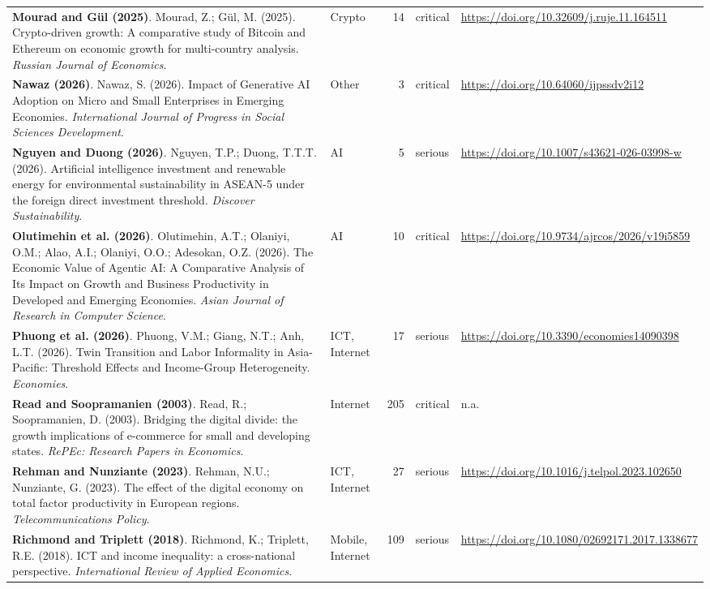 {\begin{longtable}{@{}p{7.4cm} p{1.3cm} r l p{3.4cm}@{}}
\textbf{Mourad and Gül (2025)}. Mourad, Z.; Gül, M. (2025). Crypto-driven growth: A comparative study of Bitcoin and Ethereum on economic growth for multi-country analysis. \emph{Russian Journal of Economics}. & Crypto & 14 & critical & \url{https://doi.org/10.32609/j.ruje.11.164511} \\
\textbf{Nawaz (2026)}. Nawaz, S. (2026). Impact of Generative AI Adoption on Micro and Small Enterprises in Emerging Economies. \emph{International Journal of Progress in Social Sciences Development}. & Other & 3 & critical & \url{https://doi.org/10.64060/ijpssdv2i12} \\
\textbf{Nguyen and Duong (2026)}. Nguyen, T.P.; Duong, T.T.T. (2026). Artificial intelligence investment and renewable energy for environmental sustainability in ASEAN-5 under the foreign direct investment threshold. \emph{Discover Sustainability}. & AI & 5 & serious & \url{https://doi.org/10.1007/s43621-026-03998-w} \\
\textbf{Olutimehin et al. (2026)}. Olutimehin, A.T.; Olaniyi, O.M.; Alao, A.I.; Olaniyi, O.O.; Adesokan, O.Z. (2026). The Economic Value of Agentic AI: A Comparative Analysis of Its Impact on Growth and Business Productivity in Developed and Emerging Economies. \emph{Asian Journal of Research in Computer Science}. & AI & 10 & critical & \url{https://doi.org/10.9734/ajrcos/2026/v19i5859} \\
\textbf{Phuong et al. (2026)}. Phuong, V.M.; Giang, N.T.; Anh, L.T. (2026). Twin Transition and Labor Informality in Asia-Pacific: Threshold Effects and Income-Group Heterogeneity. \emph{Economies}. & ICT, Internet & 17 & serious & \url{https://doi.org/10.3390/economies14090398} \\
\textbf{Read and Soopramanien (2003)}. Read, R.; Soopramanien, D. (2003). Bridging the digital divide: the growth implications of e-commerce for small and developing states. \emph{RePEc: Research Papers in Economics}. & Internet & 205 & critical & n.a. \\
\textbf{Rehman and Nunziante (2023)}. Rehman, N.U.; Nunziante, G. (2023). The effect of the digital economy on total factor productivity in European regions. \emph{Telecommunications Policy}. & ICT, Internet & 27 & serious & \url{https://doi.org/10.1016/j.telpol.2023.102650} \\
\textbf{Richmond and Triplett (2018)}. Richmond, K.; Triplett, R.E. (2018). ICT and income inequality: a cross-national perspective. \emph{International Review of Applied Economics}. & Mobile, Internet & 109 & serious & \url{https://doi.org/10.1080/02692171.2017.1338677} \\

\end{longtable}}
